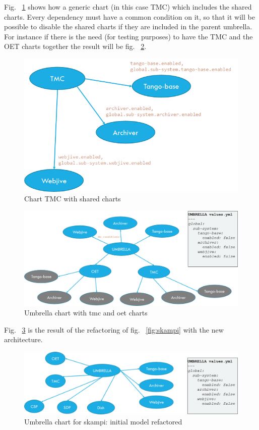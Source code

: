 \documentclass[a4paper]{spie}  %
\begin{document}
Fig. ~\ref{fig:tmc_shared_charts} shows how a generic chart (in this case TMC) which includes the shared charts. Every dependency must have a common condition on it, so that it will be possible to disable the shared charts if they are included in the parent umbrella. For instance if there is the need (for testing purposes) to have the TMC and the OET charts together the result will be fig. ~\ref{fig:tmc_oet_umbrella}.

\begin{figure}[!htb]
   \centering
   \includegraphics*[width=0.5\columnwidth]{tmc_shared_charts}
   \caption{Chart TMC with shared charts}
   \label{fig:tmc_shared_charts}
\end{figure}

\begin{figure}[!htb]
   \centering
   \includegraphics*[width=0.8\columnwidth]{tmc_oet_umbrella}
   \caption{Umbrella chart with tmc and oet charts}
   \label{fig:tmc_oet_umbrella}
\end{figure}

Fig. ~\ref{fig:umbrella_skampi} is the result of the refactoring of fig. ~\ref{fig:skampi} with the new architecture.

\begin{figure}[!htb]
   \centering
   \includegraphics*[width=1\columnwidth]{umbrella_skampi}
   \caption{Umbrella chart for skampi: initial model refactored}
   \label{fig:umbrella_skampi}
\end{figure}
\end{document}
